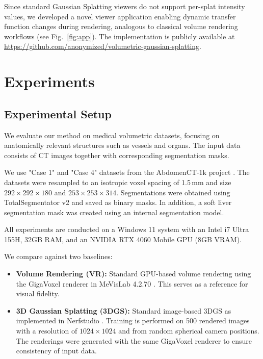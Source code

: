 \documentclass[runningheads]{llncs}
\begin{document}
Since standard Gaussian Splatting viewers do not support per-splat intensity values, we developed a novel viewer application enabling dynamic transfer function changes during rendering, analogous to classical volume rendering workflows (see Fig.~\ref{fig:app}). The implementation is publicly available at \url{https://github.com/anonymized/volumetric-gaussian-splatting}.





\section{Experiments}

\subsection{Experimental Setup}
We evaluate our method on medical volumetric datasets, focusing on anatomically relevant structures such as vessels and organs. The input data consists of CT images together with corresponding segmentation masks.

We use "Case 1" and "Case 4" datasets from the AbdomenCT-1k project \cite{ma2021abdomenct}. The datasets were resampled to an isotropic voxel spacing of 1.5\,mm and size $292 \times 292 \times 180$ and $253 \times 253 \times 314$. Segmentations were obtained using TotalSegmentator v2 and saved as binary masks. In addition, a soft liver segmentation mask was created using an internal segmentation model.

All experiments are conducted on a Windows 11 system with an Intel i7 Ultra 155H, 32GB RAM, and an NVIDIA RTX 4060 Mobile GPU (8GB VRAM).


We compare against two baselines:

\begin{itemize}
\item \textbf{Volume Rendering (VR):} Standard GPU-based volume rendering using the GigaVoxel renderer in MeVisLab 4.2.70 \cite{mevislab}. This serves as a reference for visual fidelity.

\item \textbf{3D Gaussian Splatting (3DGS):} Standard image-based 3DGS as implemented in Nerfstudio \cite{nerfstudio}. Training is performed on 500 rendered images with a resolution of $1024 \times 1024$ and from random spherical camera positions. The renderings were generated with the same GigaVoxel renderer to ensure consistency of input data.
\end{itemize}
\end{document}
